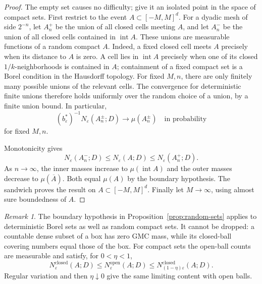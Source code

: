 \documentclass[11pt,letterpaper]{article}
\newcommand{\eps}{\varepsilon}
\theoremstyle{definition}
\theoremstyle{remark}
\newtheorem{remark}[theorem]{Remark}
\numberwithin{equation}{section}
\begin{document}
\begin{proof}
The empty set causes no difficulty; give it an isolated point in the space of compact sets. First restrict to the event $A\subset[-M,M]^d$. For a dyadic mesh of side $2^{-n}$, let $A_n^+$ be the union of all closed cells meeting $A$, and let $A_n^-$ be the union of all closed cells contained in $\operatorname{int}A$. These unions are measurable functions of a random compact $A$. Indeed, a fixed closed cell meets $A$ precisely when its distance to $A$ is zero. A cell lies in $\operatorname{int}A$ precisely when one of its closed $1/k$-neighborhoods is contained in $A$; containment of a fixed compact set is a Borel condition in the Hausdorff topology. For fixed $M,n$, there are only finitely many possible unions of the relevant cells. The convergence for deterministic finite unions therefore holds uniformly over the random choice of a union, by a finite union bound. In particular,
\begin{equation*}
 (b_\eps^*)^{-1}N_\eps(A_n^\pm;D)\longrightarrow\mu(A_n^\pm)
 \quad\text{in probability}
\end{equation*}
for fixed $M,n$.

Monotonicity gives
\begin{equation*}
 N_\eps(A_n^-;D)\le N_\eps(A;D)\le N_\eps(A_n^+;D).
\end{equation*}
As $n\to\infty$, the inner masses increase to $\mu(\operatorname{int}A)$ and the outer masses decrease to $\mu(\overline A)$. Both equal $\mu(A)$ by the boundary hypothesis. The sandwich proves the result on $A\subset[-M,M]^d$. Finally let $M\to\infty$, using almost sure boundedness of $A$.
\end{proof}

\begin{remark}\label{rem:boundary}
The boundary hypothesis in Proposition~\ref{prop:random-sets} applies to deterministic Borel sets as well as random compact sets. It cannot be dropped: a countable dense subset of a box has zero GMC mass, while its closed-ball covering numbers equal those of the box. For compact sets the open-ball counts are measurable and satisfy, for $0<\eta<1$,
\begin{equation*}
 N_\eps^{\mathrm{closed}}(A;D)
 \le N_\eps^{\mathrm{open}}(A;D)
 \le N_{(1-\eta)\eps}^{\mathrm{closed}}(A;D).
\end{equation*}
Regular variation and then $\eta\downarrow0$ give the same limiting content with open balls.
\end{remark}
\end{document}
